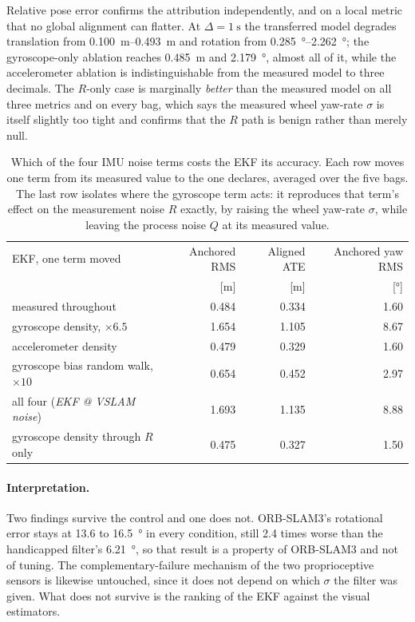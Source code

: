 Relative pose error confirms the attribution independently, and on a local metric
that no global alignment can flatter. At $\Delta=\SI{1}{\second}$ the transferred
model degrades translation from \SIrange{0.100}{0.493}{\metre} and rotation from
\SIrange{0.285}{2.262}{\degree}; the gyroscope-only ablation reaches
\SI{0.485}{\metre} and \SI{2.179}{\degree}, almost all of it, while the
accelerometer ablation is indistinguishable from the measured model to three
decimals. The $R$-only case is marginally \emph{better} than the measured model
on all three metrics and on every bag, which says the measured wheel yaw-rate
$\sigma$ is itself slightly too tight and confirms that the $R$ path is benign
rather than merely null.

\begin{table}[htbp]
\centering
\caption{Which of the four IMU noise terms costs the EKF its accuracy. Each row
moves one term from its measured value to the one
 declares, averaged over the five bags. The
last row isolates where the gyroscope term acts: it reproduces that term's effect
on the measurement noise $R$ exactly, by raising the wheel yaw-rate $\sigma$,
while leaving the process noise $Q$ at its measured value.}
\label{tab:proprio-tuning-ablation}
\small
\begin{tabular}{lrrr}
\toprule
EKF, one term moved & Anchored RMS & Aligned ATE & Anchored yaw RMS \\
 & [\si{\metre}] & [\si{\metre}] & [\si{\degree}] \\
\midrule
measured throughout & 0.484 & 0.334 & 1.60 \\
gyroscope density, $\times 6.5$ & 1.654 & 1.105 & 8.67 \\
accelerometer density & 0.479 & 0.329 & 1.60 \\
gyroscope bias random walk, $\times 10$ & 0.654 & 0.452 & 2.97 \\
all four (\emph{EKF @ VSLAM noise}) & 1.693 & 1.135 & 8.88 \\
\midrule
gyroscope density through $R$ only & 0.475 & 0.327 & 1.50 \\
\bottomrule
\end{tabular}
\end{table}

\paragraph{Interpretation.}
Two findings survive the control and one does not. ORB-SLAM3's rotational error
stays at 13.6 to \SI{16.5}{\degree} in every condition, still
\num{2.4} times worse than the handicapped filter's \SI{6.21}{\degree}, so that
result is a property of ORB-SLAM3 and not of tuning. The complementary-failure
mechanism of the two proprioceptive sensors is likewise untouched, since it does
not depend on which $\sigma$ the filter was given. What does not survive is the
ranking of the EKF against the visual estimators.


